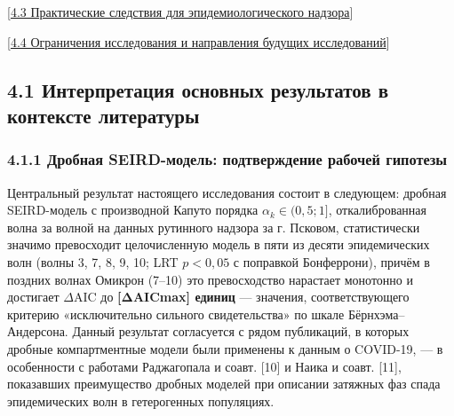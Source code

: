 \documentclass[12pt]{article}
\begin{document}
{[}\hyperref[ux43fux440ux430ux43aux442ux438ux447ux435ux441ux43aux438ux435-ux441ux43bux435ux434ux441ux442ux432ux438ux44f-ux434ux43bux44f-ux44dux43fux438ux434ux435ux43cux438ux43eux43bux43eux433ux438ux447ux435ux441ux43aux43eux433ux43e-ux43dux430ux434ux437ux43eux440ux430]{4.3
Практические следствия для эпидемиологического надзора}{]}

{[}\hyperref[ux43eux433ux440ux430ux43dux438ux447ux435ux43dux438ux44f-ux438ux441ux441ux43bux435ux434ux43eux432ux430ux43dux438ux44f-ux438-ux43dux430ux43fux440ux430ux432ux43bux435ux43dux438ux44f-ux431ux443ux434ux443ux449ux438ux445-ux438ux441ux441ux43bux435ux434ux43eux432ux430ux43dux438ux439]{4.4
Ограничения исследования и направления будущих исследований}{]}

\subsection{4.1 Интерпретация основных результатов в контексте
литературы}\label{ux438ux43dux442ux435ux440ux43fux440ux435ux442ux430ux446ux438ux44f-ux43eux441ux43dux43eux432ux43dux44bux445-ux440ux435ux437ux443ux43bux44cux442ux430ux442ux43eux432-ux432-ux43aux43eux43dux442ux435ux43aux441ux442ux435-ux43bux438ux442ux435ux440ux430ux442ux443ux440ux44b}

\subsubsection{4.1.1 Дробная SEIRD-модель: подтверждение рабочей
гипотезы}\label{ux434ux440ux43eux431ux43dux430ux44f-seird-ux43cux43eux434ux435ux43bux44c-ux43fux43eux434ux442ux432ux435ux440ux436ux434ux435ux43dux438ux435-ux440ux430ux431ux43eux447ux435ux439-ux433ux438ux43fux43eux442ux435ux437ux44b}

Центральный результат настоящего исследования состоит в следующем:
дробная SEIRD-модель с производной Капуто порядка
\(\alpha_k \in (0{,}5; 1]\), откалиброванная волна за волной на данных
рутинного надзора за г. Псковом, статистически значимо превосходит
целочисленную модель в пяти из десяти эпидемических волн (волны 3, 7, 8,
9, 10; LRT \(p < 0{,}05\) с поправкой Бонферрони), причём в поздних
волнах Омикрон (7--10) это превосходство нарастает монотонно и достигает
\(\Delta\text{AIC}\) до \textbf{{[}ΔAICmax{]} единиц} --- значения,
соответствующего критерию «исключительно сильного свидетельства» по
шкале Бёрнхэма--Андерсона. Данный результат согласуется с рядом
публикаций, в которых дробные компартментные модели были применены к
данным о COVID-19, --- в особенности с работами Раджагопала и соавт.
{[}10{]} и Наика и соавт. {[}11{]}, показавших преимущество дробных
моделей при описании затяжных фаз спада эпидемических волн в
гетерогенных популяциях.
\end{document}

